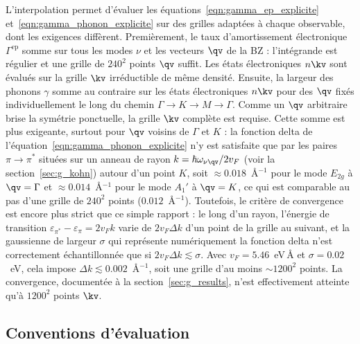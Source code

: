 L'interpolation permet d'évaluer les équations~\eqref{eqn:gamma_ep_explicite} et~\eqref{eqn:gamma_phonon_explicite} sur des grilles adaptées à chaque observable, dont les exigences diffèrent. Premièrement, le taux d'amortissement électronique $\Gamma^\text{ep}$ somme sur tous les modes $\nu$ et les vecteurs $\qv$ de la BZ : l'intégrande est régulier et une grille de $240^2$ points $\qv$ suffit. Les états électroniques $n\kv$ sont évalués sur la grille $\kv$ irréductible de même densité. Ensuite, la largeur des phonons $\gamma$ somme au contraire sur les états électroniques $n\kv$ pour des $\qv$ fixés individuellement le long du chemin $\Gamma\to K \to M\to \Gamma$. Comme un $\qv$ arbitraire brise la symétrie ponctuelle, la grille $\kv$ complète est requise. Cette somme est plus exigeante, surtout pour $\qv$ voisins de $\Gamma$ et $K$ : la fonction delta de l'équation~\eqref{eqn:gamma_phonon_explicite} n'y est satisfaite que par les paires $\pi\to\pi^*$ situées sur un anneau de rayon $k=\hbar\omega_{\nu\qv}/2v_F$ (voir la section~\ref{sec:g_kohn}) autour d'un point $K$, soit $\approx 0.018$~\AA$^{-1}$ pour le mode $E_{2g}$ à $\qv=\Gamma$ et $\approx 0.014$~\AA$^{-1}$ pour le mode $A_1'$ à $\qv=K$, ce qui est comparable au pas d'une grille de $240^2$ points ($0.012$~\AA$^{-1}$). Toutefois, le critère de convergence est encore plus strict que ce simple rapport : le long d'un rayon, l'énergie de transition $\varepsilon_{\pi^*}-\varepsilon_{\pi}=2v_F k$ varie de $2v_F\Delta k$ d'un point de la grille au suivant, et la gaussienne de largeur $\sigma$ qui représente numériquement la fonction delta n'est correctement échantillonnée que si $2v_F\Delta k\lesssim\sigma$. Avec $v_F=5.46$~eV\,\AA{} et $\sigma=0.02$~eV, cela impose $\Delta k\lesssim 0.002$~\AA$^{-1}$, soit une grille d'au moins $\sim 1200^2$ points. La convergence, documentée à la section~\ref{sec:g_results}, n'est effectivement atteinte qu'à $1200^2$ points $\kv$.

\subsection{Conventions d'évaluation}

